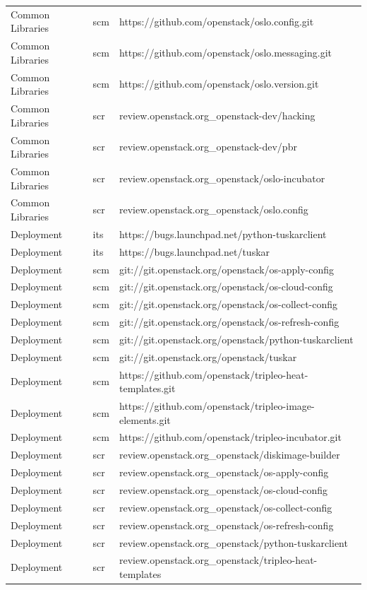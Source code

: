 \documentclass[a4wide,11pt]{report}
\begin{document}
\begin{center}
\begin{longtable}{|p{4cm}|p{1cm}|p{10cm}|}
Common Libraries&scm&https://github.com/openstack/oslo.config.git\\ 
Common Libraries&scm&https://github.com/openstack/oslo.messaging.git\\ 
Common Libraries&scm&https://github.com/openstack/oslo.version.git\\ 
Common Libraries&scr&review.openstack.org\_openstack-dev/hacking\\ 
Common Libraries&scr&review.openstack.org\_openstack-dev/pbr\\ 
Common Libraries&scr&review.openstack.org\_openstack/oslo-incubator\\ 
Common Libraries&scr&review.openstack.org\_openstack/oslo.config\\ 
Deployment&its&https://bugs.launchpad.net/python-tuskarclient\\ 
Deployment&its&https://bugs.launchpad.net/tuskar\\ 
Deployment&scm&git://git.openstack.org/openstack/os-apply-config\\ 
Deployment&scm&git://git.openstack.org/openstack/os-cloud-config\\ 
Deployment&scm&git://git.openstack.org/openstack/os-collect-config\\ 
Deployment&scm&git://git.openstack.org/openstack/os-refresh-config\\ 
Deployment&scm&git://git.openstack.org/openstack/python-tuskarclient\\ 
Deployment&scm&git://git.openstack.org/openstack/tuskar\\ 
Deployment&scm&https://github.com/openstack/tripleo-heat-templates.git\\ 
Deployment&scm&https://github.com/openstack/tripleo-image-elements.git\\ 
Deployment&scm&https://github.com/openstack/tripleo-incubator.git\\ 
Deployment&scr&review.openstack.org\_openstack/diskimage-builder\\ 
Deployment&scr&review.openstack.org\_openstack/os-apply-config\\ 
Deployment&scr&review.openstack.org\_openstack/os-cloud-config\\ 
Deployment&scr&review.openstack.org\_openstack/os-collect-config\\ 
Deployment&scr&review.openstack.org\_openstack/os-refresh-config\\ 
Deployment&scr&review.openstack.org\_openstack/python-tuskarclient\\ 
Deployment&scr&review.openstack.org\_openstack/tripleo-heat-templates\\ 

\end{longtable}
\end{center}
\end{document}
